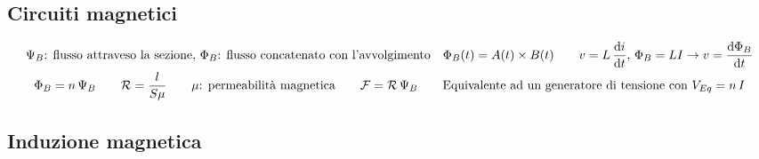 \documentclass[10pt]{article}
\begin{document}
    \vspace{-3\baselineskip}
    \subsection*{Circuiti magnetici}
    \vspace{-1.45\baselineskip}

        \begin{gather*}
            \Psi_B \text{: flusso attraveso la sezione}, \, \Phi_B \text{: flusso concatenato con l'avvolgimento} \quad \Phi_B (t) = A(t) \times B(t) \qquad v = L \, \dv{i}{t}, \, \Phi_B = L I \rightarrow v = \dv{\Phi_B}{t}\\
            \Phi_B = n \, \Psi_B \qquad \mathcal{R} = \frac{l}{S \mu} \qquad \mu \text{: permeabilità magnetica} \qquad \mathcal{F} = \mathcal{R} \, \Psi_B \qquad \text{Equivalente ad un generatore di tensione con } V_{Eq} = n \, I
        \end{gather*}

    \vspace{-1.45\baselineskip}
    \subsection*{Induzione magnetica}
\end{document}
